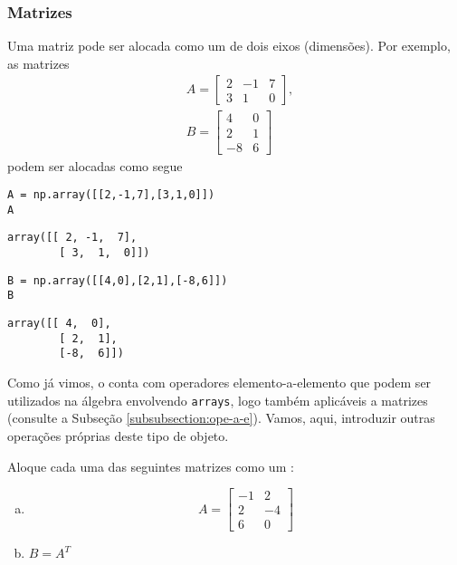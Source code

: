 \documentclass[a4paper,10pt,twoside]{article}
\begin{document}
\subsubsection{Matrizes}\label{sec_alglin}

Uma matriz pode ser alocada como um {\PYTHONnumpyDOTarray} de dois eixos (dimensões). Por exemplo, as matrizes
\begin{align}
  &A =
  \begin{bmatrix}
    2 & -1 & 7\\
    3 & 1 & 0
  \end{bmatrix},\label{sec_alglin:eq:A}\\
  &B =
  \begin{bmatrix}
    4 & 0\\
    2 & 1\\
   -8 & 6
  \end{bmatrix}\label{sec_alglin:eq:B}
\end{align}
podem ser alocadas como segue

\begin{lstlisting}
A = np.array([[2,-1,7],[3,1,0]])
A
\end{lstlisting}

\begin{verbatim}
array([[ 2, -1,  7],
        [ 3,  1,  0]])
\end{verbatim}

\begin{lstlisting}
B = np.array([[4,0],[2,1],[-8,6]])
B
\end{lstlisting}

\begin{verbatim}
array([[ 4,  0],
        [ 2,  1],
        [-8,  6]])
\end{verbatim}

Como já vimos, o {\numpy} conta com operadores elemento-a-elemento que podem ser utilizados na álgebra envolvendo \texttt{arrays}, logo também aplicáveis a matrizes (consulte a Subseção \ref{subsubsection:ope-a-e}). Vamos, aqui, introduzir outras operações próprias deste tipo de objeto.

\begin{exr}
  Aloque cada uma das seguintes matrizes como um {\PYTHONnumpyDOTarray}:
  \begin{enumerate}[a)]
  \item
    \begin{equation}
      A =
      \begin{bmatrix}
        -1 & 2\\
        2 & -4\\
        6 & 0
      \end{bmatrix}
    \end{equation}
  \item $B = A^T$ 
  \end{enumerate}
\end{exr}
\end{document}

